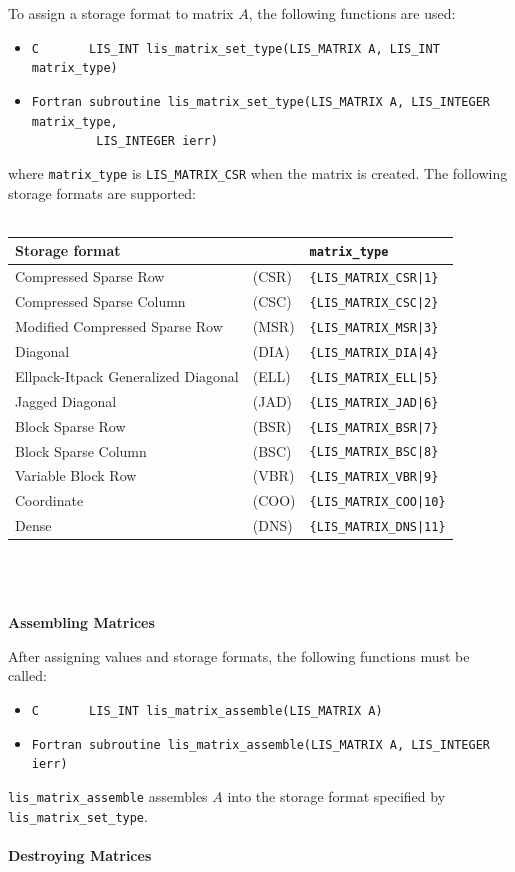 \documentclass[a4paper]{article}
\begin{document}
To assign a storage format to matrix $A$, 
the following functions are used: 
\begin{itemize}
\item \verb|C       LIS_INT lis_matrix_set_type(LIS_MATRIX A, LIS_INT matrix_type)|
\item \verb|Fortran subroutine lis_matrix_set_type(LIS_MATRIX A, LIS_INTEGER matrix_type,|\\
      \verb|         LIS_INTEGER ierr)|
\end{itemize}
where \verb+matrix_type+ is \verb+LIS_MATRIX_CSR+ when the matrix is created. 
The following storage formats are supported:
\\ \\
\begin{minipage}[t]{\textwidth}
\begin{center}
\begin{tabular}{lll}\hline\hline
Storage format  & & \verb|matrix_type| \\ \hline
Compressed Sparse Row & (CSR) & \verb={LIS_MATRIX_CSR|1}= \\
Compressed Sparse Column & (CSC) & \verb={LIS_MATRIX_CSC|2}= \\
Modified Compressed Sparse Row & (MSR) & \verb={LIS_MATRIX_MSR|3}= \\
Diagonal &(DIA) & \verb={LIS_MATRIX_DIA|4}= \\
Ellpack-Itpack Generalized Diagonal &(ELL) & \verb={LIS_MATRIX_ELL|5}= \\
Jagged Diagonal &(JAD) & \verb={LIS_MATRIX_JAD|6}= \\
Block Sparse Row & (BSR) & \verb={LIS_MATRIX_BSR|7}= \\
Block Sparse Column &(BSC) & \verb={LIS_MATRIX_BSC|8}= \\
Variable Block Row &(VBR) & \verb={LIS_MATRIX_VBR|9}= \\
Coordinate & (COO) & \verb={LIS_MATRIX_COO|10}= \\
Dense &	(DNS) & \verb={LIS_MATRIX_DNS|11}= \\
\hline         
\end{tabular}
\end{center}
\end{minipage}
\\ \\ \\
\noindent
{\bf Assembling Matrices}

After assigning values and storage formats, the following functions must be called:
\begin{itemize}
\item \verb|C       LIS_INT lis_matrix_assemble(LIS_MATRIX A)|
\item \verb|Fortran subroutine lis_matrix_assemble(LIS_MATRIX A, LIS_INTEGER ierr)|
\end{itemize}
\verb|lis_matrix_assemble| assembles $A$ into the storage format specified by \verb|lis_matrix_set_type|.
\\ \\ 
\noindent
{\bf Destroying Matrices}
\end{document}
